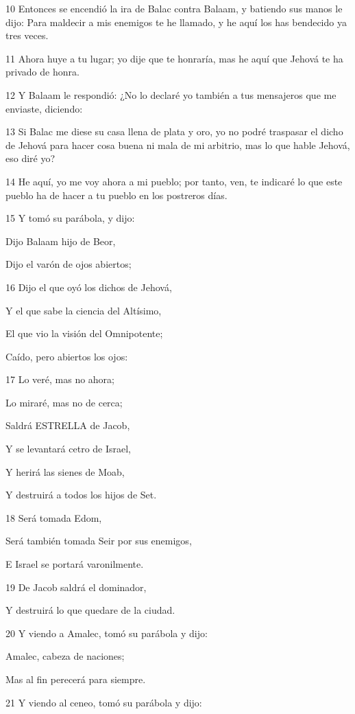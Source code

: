 \par 10 Entonces se encendió la ira de Balac contra Balaam, y batiendo sus manos le dijo: Para maldecir a mis enemigos te he llamado, y he aquí los has bendecido ya tres veces.
\par 11 Ahora huye a tu lugar; yo dije que te honraría, mas he aquí que Jehová te ha privado de honra.
\par 12 Y Balaam le respondió: ¿No lo declaré yo también a tus mensajeros que me enviaste, diciendo:
\par 13 Si Balac me diese su casa llena de plata y oro, yo no podré traspasar el dicho de Jehová para hacer cosa buena ni mala de mi arbitrio, mas lo que hable Jehová, eso diré yo?
\par 14 He aquí, yo me voy ahora a mi pueblo; por tanto, ven, te indicaré lo que este pueblo ha de hacer a tu pueblo en los postreros días.
\par 15 Y tomó su parábola, y dijo:
\par Dijo Balaam hijo de Beor,
\par Dijo el varón de ojos abiertos;
\par 16 Dijo el que oyó los dichos de Jehová,
\par Y el que sabe la ciencia del Altísimo,
\par El que vio la visión del Omnipotente;
\par Caído, pero abiertos los ojos:
\par 17 Lo veré, mas no ahora;
\par Lo miraré, mas no de cerca;
\par Saldrá ESTRELLA de Jacob,
\par Y se levantará cetro de Israel,
\par Y herirá las sienes de Moab,
\par Y destruirá a todos los hijos de Set.
\par 18 Será tomada Edom,
\par Será también tomada Seir por sus enemigos,
\par E Israel se portará varonilmente.
\par 19 De Jacob saldrá el dominador,
\par Y destruirá lo que quedare de la ciudad.
\par 20 Y viendo a Amalec, tomó su parábola y dijo: 
\par Amalec, cabeza de naciones; 
\par Mas al fin perecerá para siempre. 
\par 21 Y viendo al ceneo, tomó su parábola y dijo: 
